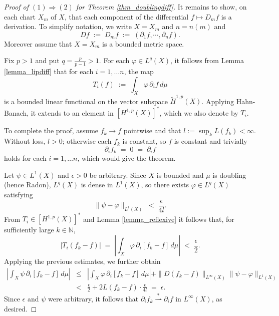 \documentclass[reqno]{amsart}
\theoremstyle{plain}
\theoremstyle{definition}
\theoremstyle{remark}
\numberwithin{equation}{section}
\newcommand{\e}{\epsilon}
\newcommand{\N}{\mathbb{N}}
\newcommand{\U}{\Upsilon}
\newcommand{\wsto}{\stackrel{*}{\rightharpoonup}}
\begin{document}
\begin{proof}[Proof of $(1) \Rightarrow (2)$ for Theorem \ref{thm_doublingdiff}]
It remains to show, on each chart $X_m$ of $X$, that each component of the differential $f \mapsto D_mf$ is a derivation.
To simplify notation, we write $X = X_m$ and $n = n(m)$ and
$$
Df \;:=\; 
D_mf \;:=\; 
( \partial_1f, \cdots, \partial_nf ).
$$
Moreover assume that $X=X_m$ is a bounded metric space.

Fix $p > 1$ and put $q = \frac{p}{p-1}> 1$. For each $\varphi \in L^q(X)$, it follows from Lemma \ref{lemma_lipdiff} that for each $i = 1, \ldots n$, the map
\begin{equation} \label{eq_fnl}
T_i(f) \;:=\;
\int_X  \varphi \, \partial_if \,d\mu
\end{equation}
is a bounded linear functional on the vector subspace $\tilde{H}^{1,p}(X)$.  Applying Hahn-Banach, it extends to an element in $[H^{1,p}(X)]^*$, which we also denote by $T_i$.

To complete the proof, assume $f_k \to f$ pointwise and that 
$l := \sup_k L(f_k) < \infty.$
Without loss, $l > 0$; otherwise each $f_k$ is constant, so $f$ is constant and trivially 
$$
\partial_if_k \;=\; 0 \;=\; \partial_if
$$
holds for each $i = 1, \ldots n$, which would give the theorem.

Let $\psi \in L^1(X)$ and $\e > 0$ be arbitrary.  Since $X$ is bounded and $\mu$ is doubling (hence Radon), $L^q(X)$ is dense in $L^1(X)$, so there exists $\varphi \in L^q(X)$ satisfying 
$$
\|\psi - \varphi\|_{L^1(X)} \;<\; \frac{\e}{4l}.
$$
From $T_i \in [H^{1,p}(X)]^*$ and Lemma \ref{lemma_reflexive} it follows that, for sufficiently large $k \in \N$,
$$
|T_i(f_k-f)| \;=\;
\left|
\int_X \varphi \, \partial_i[f_k-f] \,d\mu 
\right| \;<\; \frac{\e}{2}.
$$
Applying the previous estimates, we further obtain
\begin{eqnarray*}
\left|
\int_X \psi \, \partial_i[f_k-f] \,d\mu 
\right| &\leq&
\left|
\int_X \varphi \, \partial_i[f_k-f] \,d\mu 
\right|
+ \| D(f_k-f) \|_{L^\infty(X)} \|\psi-\varphi\|_{L^1(X)} \\ &<&
\frac{\e}{2} + 2 L(f_k-f) \cdot \frac{\e}{4l} \;=\; \e.
\end{eqnarray*}
Since $\e$ and $\psi$ were arbitrary, it follows that $\partial_if_k \wsto \partial_if$ in $L^\infty(X)$, as desired.
\end{proof}



\end{document}
